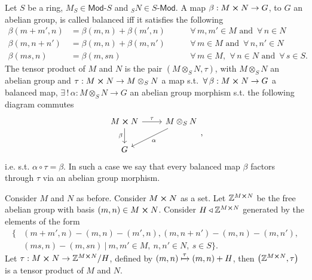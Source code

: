 \begin{defn}
	Let $S$ be a ring, $M_S \in \mathsf{Mod}\text{-}S$ and ${}_SN \in S\text{-}\mathsf{Mod}$.
	A map $\beta: M \cross N \to G$, to $G$ an abelian group, is called balanced iff
	it satisfies the following
	\begin{align}
		\beta(m + m', n) &= \beta(m,n) + \beta(m',n) \qquad & \,\forall\, m, m' \in M \text{ and } \,\forall\, n \in N\\
		\beta(m, n + n') &= \beta(m,n) + \beta(m,n') \qquad & \,\forall\, m \in M \text{ and } \,\forall\, n, n' \in N\\
		\beta(ms, n) &= \beta(m,sn) \qquad & \,\forall\, m \in M,\ \,\forall\, n \in N \text{ and } \,\forall\, s \in S
	.\end{align} 
	The tensor product of $M$ and $N$ is the pair $\left(M \otimes_{S} N, \tau \right)$,
	with $M \otimes_{S} N$ an abelian group and $\tau: M \cross N \to M \otimes_{S} N$ a map s.t.
	$\,\forall\, \beta: M \cross N \to G$ a balanced map, $\exists\, !\, \alpha: M \otimes_{S} N \to G$ an abelian group morphism
	s.t. the following diagram commutes
	\begin{equation}
	\begin{tikzcd}
		M \cross N \arrow[r, "\tau", rightarrow] \arrow[d, "\beta"', rightarrow] &
		M \otimes_{S} N \arrow[dl, "\alpha", rightarrow] \\
		G &
	\end{tikzcd}
	,\end{equation} 
	i.e. s.t. $\alpha \circ \tau = \beta$.
	In such a case we say that every balanced map $\beta$ factors through $\tau$ via an abelian group morphism.
\end{defn}

\begin{rem}
	Consider $M$ and $N$ as before.
	Consider $M \cross N$ as a set.
	Let $\mathbb{Z}^{M \cross N}$ be the free abelian group with basis $\left(m, n\right) \in M \cross N$.
	Consider $H \triangleleft \mathbb{Z}^{M \cross N}$ generated by the elements of the form
	\begin{align}
		\big\{& \left(m + m', n\right) - \left(m, n\right) - \left(m',n \right),
	\left(m, n + n'\right) - \left(m, n\right) - \left(m, n'\right),\\
		      &\left(ms, n\right) - \left(m, sn\right)
		     \ \big|\ m,m' \in M,\ n,n' \in N,\ s \in S \big\}
	.\end{align} 
	Let $\tau: M \cross N \to \mathbb{Z}^{M \cross N}/H$, defined by $\left(m, n\right) \xmapsto{\tau} \left(m, n\right) + H$,
	then $\left(\mathbb{Z}^{M \cross N}, \tau\right)$ is a tensor product of $M$ and $N$.
\end{rem}

